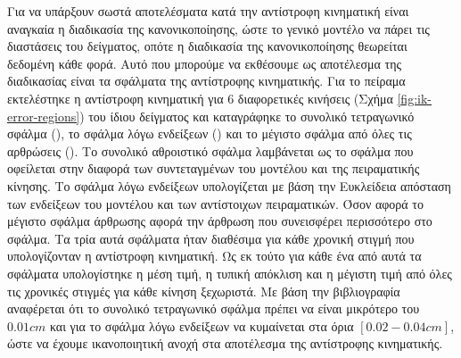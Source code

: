 Για να υπάρξουν σωστά αποτελέσματα κατά την αντίστροφη κινηματική είναι αναγκαία η διαδικασία της κανονικοποίησης, ώστε το γενικό μοντέλο να πάρει τις διαστάσεις του δείγματος, οπότε η διαδικασία της κανονικοποίησης θεωρείται δεδομένη κάθε φορά. Αυτό που μπορούμε να εκθέσουμε ως αποτέλεσμα της διαδικασίας είναι τα σφάλματα της αντίστροφης κινηματικής. Για το πείραμα εκτελέστηκε η αντίστροφη κινηματική για 6 διαφορετικές κινήσεις (Σχήμα \ref{fig:ik-error-regions}) του ίδιου δείγματος και καταγράφηκε το συνολικό τετραγωνικό σφάλμα (), το σφάλμα λόγω ενδείξεων () και το μέγιστο σφάλμα από όλες τις αρθρώσεις (). Το συνολικό αθροιστικό σφάλμα λαμβάνεται ως το σφάλμα που οφείλεται στην διαφορά των συντεταγμένων του μοντέλου και της πειραματικής κίνησης. Το σφάλμα λόγω ενδείξεων υπολογίζεται με βάση την Ευκλείδεια απόσταση των ενδείξεων του μοντέλου και των αντίστοιχων πειραματικών. Όσον αφορά το μέγιστο σφάλμα άρθρωσης αφορά την άρθρωση που συνεισφέρει περισσότερο στο σφάλμα. Τα τρία αυτά σφάλματα ήταν διαθέσιμα για κάθε χρονική στιγμή που υπολογίζονταν η αντίστροφη κινηματική. Ως εκ τούτο για κάθε ένα από αυτά τα σφάλματα υπολογίστηκε η μέση τιμή, η τυπική απόκλιση και η μέγιστη τιμή από όλες τις χρονικές στιγμές για κάθε κίνηση ξεχωριστά. Με βάση την βιβλιογραφία αναφέρεται ότι το συνολικό τετραγωνικό σφάλμα πρέπει να είναι μικρότερο του $0.01cm$ και για το σφάλμα λόγω ενδείξεων να κυμαίνεται στα όρια $[0.02-0.04cm]$, ώστε να έχουμε ικανοποιητική ανοχή στα αποτέλεσμα της αντίστροφης κινηματικής.


